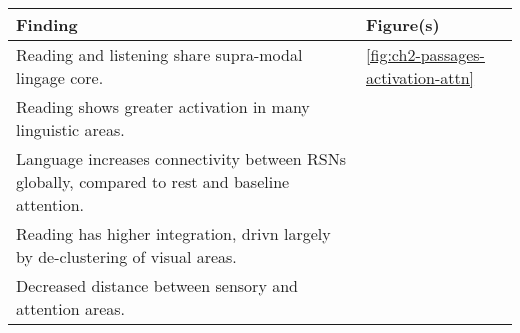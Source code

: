 \begin{tabular}{ll}
\toprule 
Finding & Figure(s) \\ 
\midrule 
Reading and listening share supra-modal lingage core.	& \ref{fig:ch2-passages-activation-attn} \\ 
Reading shows greater activation in many linguistic areas.	&  \\ 
Language increases connectivity between RSNs globally, compared to rest and baseline attention.	&  \\ 
Reading has higher integration, drivn largely by de-clustering of visual areas.	&   \\ 
Decreased distance between sensory and attention areas.  &   \\ 
\bottomrule 
\end{tabular}